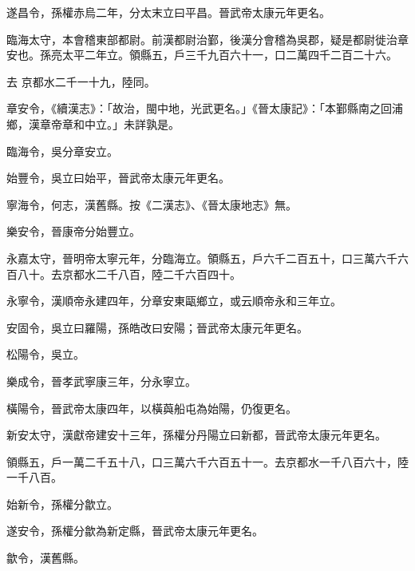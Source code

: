 \begin{pinyinscope}
 遂昌令，孫權赤烏二年，分太末立曰平昌。晉武帝太康元年更名。



 臨海太守，本會稽東部都尉。前漢都尉治鄞，後漢分會稽為吳郡，疑是都尉徙治章安也。孫亮太平二年立。領縣五，戶三千九百六十一，口二萬四千二百二十六。



 去
 京都水二千一十九，陸同。



 章安令，《續漢志》：「故治，閩中地，光武更名。」《晉太康記》：「本鄞縣南之回浦鄉，漢章帝章和中立。」未詳孰是。



 臨海令，吳分章安立。



 始豐令，吳立曰始平，晉武帝太康元年更名。



 寧海令，何志，漢舊縣。按《二漢志》、《晉太康地志》無。



 樂安令，晉康帝分始豐立。



 永嘉太守，晉明帝太寧元年，分臨海立。領縣五，戶六千二百五十，口三萬六千六百八十。去京都水二千八百，陸二千六百四十。



 永寧令，漢順帝永建四年，分章安東甌鄉立，或云順帝永和三年立。



 安固令，吳立曰羅陽，孫皓改曰安陽；晉武帝太康元年更名。



 松陽令，吳立。



 樂成令，晉孝武寧康三年，分永寧立。



 橫陽令，晉武帝太康四年，以橫藇船屯為始陽，仍復更名。



 新安太守，漢獻帝建安十三年，孫權分丹陽立曰新都，晉武帝太康元年更名。



 領縣五，戶一萬二千五十八，口三萬六千六百五十一。去京都水一千八百六十，陸一千八百。



 始新令，孫權分歙立。



 遂安令，孫權分歙為新定縣，晉武帝太康元年更名。



 歙令，漢舊縣。




\end{pinyinscope}

